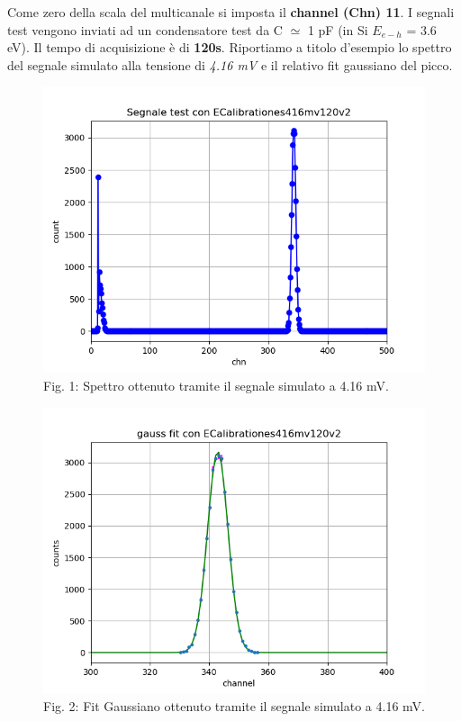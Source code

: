 \documentclass[a4paper]{article}
\begin{document}
	Come zero della scala del multicanale si imposta il \textbf{channel (Chn) 11}. I segnali test vengono inviati ad un condensatore test da C $\simeq$ 1 pF (in Si $E_{e-h}$ = 3.6 eV). Il tempo di acquisizione è di \textbf{120s}. Riportiamo a titolo d'esempio lo spettro del segnale simulato alla tensione di \emph{4.16 mV} e il relativo fit gaussiano del picco.

\begin{figure}[H]
\includegraphics[width=1\textwidth]{Visualecon_ECalibrationes416mv120v2}
        \caption{Fig. 1: Spettro ottenuto tramite il segnale simulato a 4.16 mV.  }
        \label{fig:1}
\end{figure}

\begin{figure}[H]
\includegraphics[width=1\textwidth]{fit_gaussiano_con_ECalibrationes416mv120v2}
        \caption{Fig. 2: Fit Gaussiano ottenuto tramite il segnale simulato a 4.16 mV.  }
        \label{fig:2}
\end{figure}
	
\end{document}
